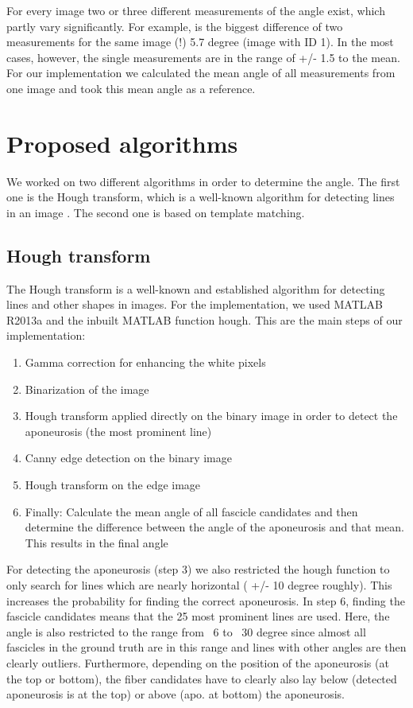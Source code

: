 \documentclass[10pt,twocolumn,letterpaper]{article}
\begin{document}
For every image two or three different measurements of the angle exist, which partly vary significantly. For example, is the biggest difference of two measurements for the same image (!) 5.7 degree (image with ID 1). In the most cases, however, the single measurements are in the range of +/- 1.5 to the mean.
For our implementation we calculated the mean angle of all measurements from one image and took this mean angle as a reference.

\section{Proposed algorithms}
We worked on two different algorithms in order to determine the angle. The first one is the Hough transform, which is a well-known algorithm for detecting lines in an image \cite{c1962method}. The second one is based on template matching.

\subsection{Hough transform}
\label{sec:hough}
The Hough transform is a well-known and established algorithm for detecting lines and other shapes in images. For the implementation, we used MATLAB R2013a and the inbuilt MATLAB function hough.
This are the main steps of our implementation:

\begin{enumerate}
     \item Gamma correction for enhancing the white pixels
     \item Binarization of the image
     \item Hough transform applied directly on the binary image in order to detect the aponeurosis (the most prominent line)
     \item Canny edge detection on the binary image
     \item Hough transform on the edge image
     \item Finally: Calculate the mean angle of all fascicle candidates and then determine the difference between the angle of the aponeurosis and that mean. This results in the final angle
\end{enumerate}

For detecting the aponeurosis (step 3) we also restricted the hough function to only search for lines which are nearly horizontal ( +/- 10 degree roughly). This increases the probability for finding the correct aponeurosis. In step 6, finding the fascicle candidates means that the 25 most prominent lines are used. Here, the angle is also restricted to the range from ~6 to ~30 degree since almost all fascicles in the ground truth are in this range and lines with other angles are then clearly outliers. Furthermore, depending on the position of the aponeurosis (at the top or bottom), the fiber candidates have to clearly also lay below (detected aponeurosis is at the top) or above (apo. at bottom) the aponeurosis.
\end{document}
